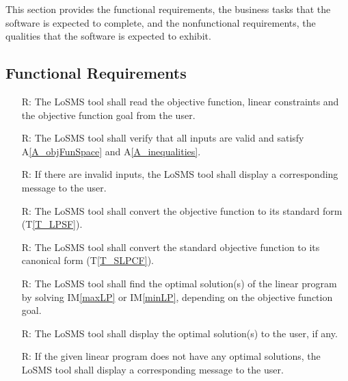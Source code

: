 \documentclass[12pt]{article}
\newcommand{\tref}[1]{T\ref{#1}}
\newcommand{\aref}[1]{A\ref{#1}}
\newcommand{\iref}[1]{IM\ref{#1}}
\newcounter{reqnum} %
\newcommand{\famname}{LoSMS} %
\begin{document}
This section provides the functional requirements, the business tasks that the
software is expected to complete, and the nonfunctional requirements, the
qualities that the software is expected to exhibit.

\subsection{Functional Requirements}

\noindent 
\begin{itemize}
	\item[R\refstepcounter{reqnum}\thereqnum \label{R_Inputs}:] The \famname{} 
	tool shall read the objective function, linear constraints and the 
	objective function goal from the user.
	
	\item[R\refstepcounter{reqnum}\thereqnum \label{R_HandleInputErrors}:] The 
	\famname{} tool shall verify that all inputs are valid and satisfy 
	\aref{A_objFunSpace} and \aref{A_inequalities}.
	
	\item[R\refstepcounter{reqnum}\thereqnum \label{R_DisplayErrorMsg}:] If 
	there are invalid inputs, the \famname{} tool shall display a corresponding 
	message to the user.
	
	\item[R\refstepcounter{reqnum}\thereqnum \label{R_StandardForm}:] The 
	\famname{} tool shall convert the objective function to its standard form 
	(\tref{T_LPSF}).
	
	\item[R\refstepcounter{reqnum}\thereqnum \label{R_CanonicalForm}:] The 
	\famname{} tool shall convert the standard objective function to its 
	canonical form (\tref{T_SLPCF}).

	\item[R\refstepcounter{reqnum}\thereqnum \label{R_Calculate}:] The 
	\famname{} tool shall find the optimal solution(s) of the linear program by 
	solving \iref{maxLP} or \iref{minLP}, depending on the objective function 
	goal.
	
	\item[R\refstepcounter{reqnum}\thereqnum \label{R_Output}:] The \famname{} 
	tool shall display the optimal solution(s) to the user, if any.
	
	\item[R\refstepcounter{reqnum}\thereqnum \label{R_OutputError}:] If the 
	given linear program does not have any optimal solutions, the \famname{} 
	tool shall display a corresponding message to the user.
\end{itemize}
\end{document}
